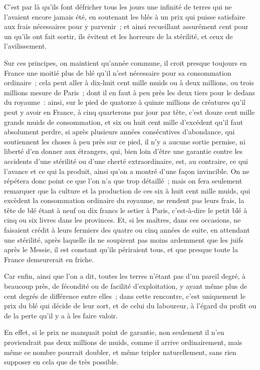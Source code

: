 \documentclass[french,twoside]{book} %
\begin{document}
C’est par là qu’ils font défricher tous les jours une infinité de terres qui ne l’avaient encore jamais été, en soutenant les blés à un prix qui puisse satisfaire aux frais nécessaires pour y parvenir ; et ainsi recueillant assurément cent pour un qu’ils ont fait sortir, ils évitent et les horreurs de la stérilité, et ceux de l’avilissement.\par
Sur ces principes, on maintient qu’année commune, il croit presque toujours en France une moitié plus de blé qu’il n’est nécessaire pour sa consommation ordinaire ; cela peut aller à dix-huit cent mille muids ou à deux millions, ou trois millions mesure de Paris ; dont il en faut à peu près les deux tiers pour le dedans du royaume : ainsi, sur le pied de quatorze à quinze millions de créatures qu’il peut y avoir en France, à cinq quarterons par jour par tête, c’est douze cent mille grands muids de consommation, et six ou huit cent mille d’excédent qu’il faut absolument perdre, si après plusieurs années consécutives d’abondance, qui soutiennent les choses à peu près sur ce pied, il n’y a aucune sortie permise, ni liberté d’en donner aux étrangers, qui, bien loin d’être une garantie contre les accidents d’une stérilité ou d’une cherté extraordinaire, est, au contraire, ce qui l’avance et ce qui la produit, ainsi qu’on a montré d’une façon invincible. On ne répétera donc point ce que l’on n’a que trop détaillé ; mais on fera seulement remarquer que la culture et la production de ces six à huit cent mille muids, qui excèdent la consommation ordinaire du royaume, ne rendent pas leurs frais, la tête de blé étant à neuf ou dix francs le setier à Paris, c’est-à-dire le petit blé à cinq ou six livres dans les provinces. Et, si les maîtres, dans ces occasions, ne faisaient crédit à leurs fermiers des quatre ou cinq années de suite, en attendant une stérilité, après laquelle ils ne soupirent pas moins ardemment que les juifs après le Messie, il est constant qu’ils périraient tous, et que presque toute la France demeurerait en friche.\par
Car enfin, ainsi que l’on a dit, toutes les terres n’étant pas d’un pareil degré, à beaucoup près, de fécondité ou de facilité d’exploitation, y ayant même plus de cent degrés de différence entre elles ; dans cette rencontre, c’est uniquement le prix du blé qui décide de leur sort, et de celui du laboureur, à l’égard du profit ou de la perte qu’il y a à les faire valoir.\par
En effet, si le prix ne manquait point de garantie, non seulement il n’en proviendrait pas deux millions de muids, comme il arrive ordinairement, mais même ce nombre pourrait doubler, et même tripler naturellement, sans rien supposer en cela que de très possible.\par
\end{document}
